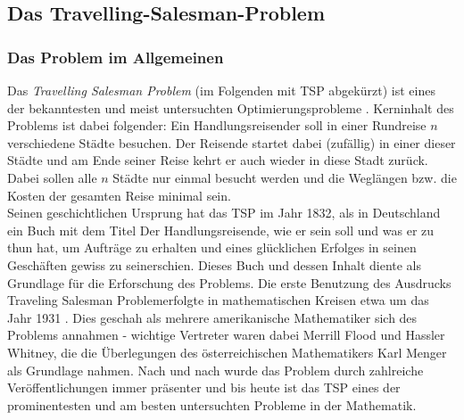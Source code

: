 \documentclass[doktyp=barbeit, sprache=german]{TUBAFarbeiten}
\begin{document}
\subsection{Das Travelling-Salesman-Problem}
\subsubsection{Das Problem im Allgemeinen}
Das \textit{Travelling Salesman Problem} (im Folgenden mit TSP abgekürzt) ist eines der bekanntesten und meist untersuchten Optimierungsprobleme \cite{TaschenbuchAlgorithmen}. Kerninhalt des Problems ist dabei folgender: Ein Handlungsreisender soll in einer Rundreise \(n\) verschiedene Städte besuchen. Der Reisende startet dabei (zufällig) in einer dieser Städte und am Ende seiner Reise kehrt er auch wieder in diese Stadt zurück. Dabei sollen alle $n$ Städte nur einmal besucht werden und die Weglängen bzw. die Kosten der gesamten Reise minimal sein.
\\Seinen geschichtlichen Ursprung hat das TSP im Jahr 1832, als in Deutschland ein Buch mit dem Titel \glqq Der Handlungsreisende, wie er sein soll und was er zu thun hat, um Aufträge zu erhalten und eines glücklichen Erfolges in seinen Geschäften gewiss zu sein\grqq erschien. Dieses Buch und dessen Inhalt diente als Grundlage für die Erforschung des Problems. Die erste Benutzung des Ausdrucks \glqq Traveling Salesman Problem\grqq erfolgte in mathematischen Kreisen etwa um das Jahr 1931 \cite{TSP}. 
Dies geschah als mehrere amerikanische Mathematiker sich des Problems annahmen - wichtige Vertreter waren dabei Merrill Flood und Hassler Whitney, die die Überlegungen des österreichischen Mathematikers Karl Menger als Grundlage nahmen. Nach und nach wurde das Problem durch zahlreiche Veröffentlichungen immer präsenter und bis heute ist das TSP eines der prominentesten und am besten untersuchten Probleme in der Mathematik.
\end{document}
